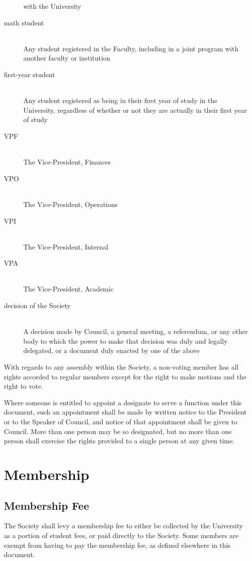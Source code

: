 \begin{description}
  with the University
\item[math student]\hfill\\
  Any student registered in the Faculty, including in a joint program with
  another faculty or institution
\item[first-year student]\hfill\\
  Any student registered as being in their first year of study in the
  University, regardless of whether or not they are actually in their first year
  of study
\item[VPF]\hfill\\
  The Vice-President, Finances
\item[VPO]\hfill\\
  The Vice-President, Operations
\item[VPI]\hfill\\
  The Vice-President, Internal
\item[VPA]\hfill\\
  The Vice-President, Academic
\item[decision of the Society]\hfill\\
  A decision made by Council, a general meeting, a referendum, or any other body
  to which the power to make that decision was duly and legally delegated, or a
  document duly enacted by one of the above
\end{description}

With regards to any assembly within the Society, a non-voting member has all
rights accorded to regular members except for the right to make motions and
the right to vote.

Where someone is entitled to appoint a designate to serve a function
under this document, such an appointment shall be made by written notice to
the President or to the Speaker of Council, and notice of that appointment
shall be given to Council. More than one person may be so designated, but no
more than one person shall exercise the rights provided to a single person at
any given time.

\section{Membership}
\subsection{Membership Fee}
The Society shall levy a membership fee to either be collected by the University
as a portion of student fees, or paid directly to the Society. Some members are
exempt from having to pay the membership fee, as defined elsewhere in this
document.


